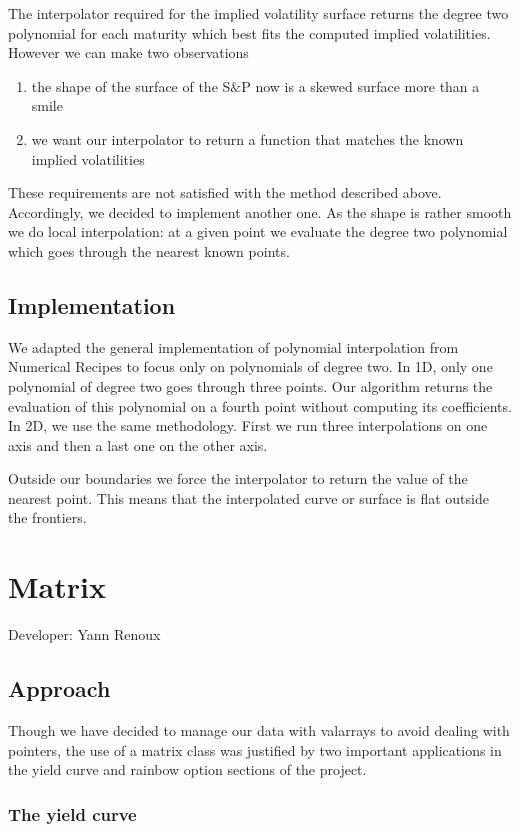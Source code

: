 The interpolator required for the implied volatility surface returns the degree two polynomial for each
maturity which best fits the computed implied volatilities.  However we can make two observations
\begin{enumerate}
	\item the shape of the surface of the S$\&$P now is a skewed surface more than a smile
	\item we want our interpolator to return a function that matches the known implied volatilities
\end{enumerate}
These requirements are not satisfied with the method described above.  Accordingly, we decided to implement another one. As the shape is rather smooth we do local interpolation: at a given point we evaluate the degree two polynomial which goes through the nearest known points. 


\subsection{Implementation}
We adapted the general implementation of polynomial interpolation from Numerical Recipes to focus only on polynomials of degree two.
In 1D, only one polynomial of degree two goes through three points. Our algorithm returns the evaluation of this polynomial on a fourth point without computing its coefficients.
In 2D, we use the same methodology. First we run three interpolations on one axis and then a last one on the other axis.

Outside our boundaries we force the interpolator to return the value of the nearest point.  This means that the interpolated curve or surface is flat outside the frontiers.

\section{Matrix}

Developer: Yann Renoux

\subsection{Approach}

Though we have decided to manage our data with valarrays to avoid dealing with pointers, the use of a matrix class was justified by two important applications in the yield curve and rainbow option sections of the project.

\subsubsection{The yield curve}

